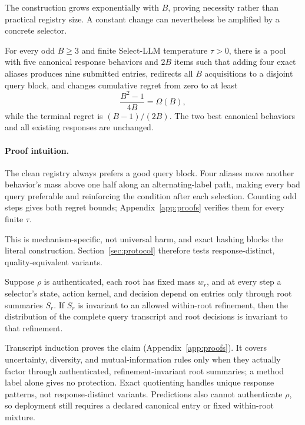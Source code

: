 The construction grows exponentially with $B$, proving necessity rather than practical registry size. A constant change can nevertheless be amplified by a concrete selector.

\begin{theorem}
\label{thm:amplification}
For every odd $B\geq3$ and finite Select-LLM temperature $\tau>0$, there is a pool with five canonical response behaviors and $2B$ items such that adding four exact aliases produces nine submitted entries, redirects all $B$ acquisitions to a disjoint query block, and changes cumulative regret from zero to at least
\[
\frac{B^2-1}{4B}=\Omega(B),
\]
while the terminal regret is $(B-1)/(2B)$. The two best canonical behaviors and all existing responses are unchanged.
\end{theorem}

\paragraph{Proof intuition.}
The clean registry always prefers a good query block. Four aliases move another behavior's mass above one half along an alternating-label path, making every bad query preferable and reinforcing the condition after each selection. Counting odd steps gives both regret bounds; Appendix~\ref{app:proofs} verifies them for every finite $\tau$.

This is mechanism-specific, not universal harm, and exact hashing blocks the literal construction. Section~\ref{sec:protocol} therefore tests response-distinct, quality-equivalent variants.

\begin{proposition}
\label{prop:factorization}
Suppose $\rho$ is authenticated, each root has fixed mass $w_r$, and at every step a selector's state, action kernel, and decision depend on entries only through root summaries $S_r$. If $S_r$ is invariant to an allowed within-root refinement, then the distribution of the complete query transcript and root decisions is invariant to that refinement.
\end{proposition}

Transcript induction proves the claim (Appendix~\ref{app:proofs}). It covers uncertainty, diversity, and mutual-information rules only when they actually factor through authenticated, refinement-invariant root summaries; a method label alone gives no protection. Exact quotienting handles unique response patterns, not response-distinct variants. Predictions also cannot authenticate $\rho$, so deployment still requires a declared canonical entry or fixed within-root mixture.
